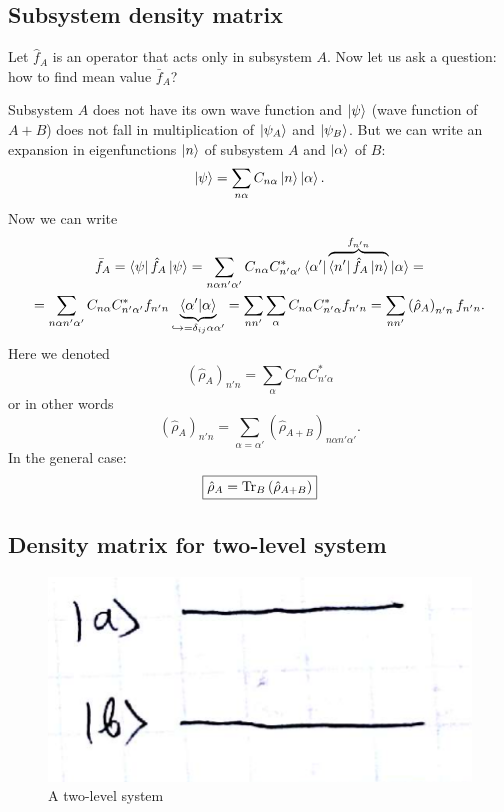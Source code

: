 \subsection{Subsystem density matrix}

Let $\hat{f}_A$ is an operator that acts only in subsystem $A$. Now let us ask a question: how to find mean value $\bar{f}_A$?

Subsystem $A$ does not have its own wave function and $\left\lvert {\psi} \right\rangle$ (wave function of $A + B$) does not fall in multiplication of $\left\lvert {\psi_A} \right\rangle$ and $\left\lvert {\psi_B} \right\rangle$. But we can write an expansion in eigenfunctions $\left\lvert {n} \right\rangle$ of subsystem $A$ and $\left\lvert {\alpha} \right\rangle$ of $B$:
\begin{equation}
	\left\lvert {\psi} \right\rangle = \sum_{n \alpha} C_{n \alpha} \left\lvert {n} \right\rangle \left\lvert {\alpha} \right\rangle.
\end{equation}
Now we can write
\begin{multline}
	\bar{f}_A = \left\langle {\psi} \right\rvert \hat{f}_A \left\lvert {\psi} \right\rangle = \sum_{n \alpha n' \alpha'} C_{n \alpha} C^*_{n' \alpha'} \left\langle {\alpha'} \right\rvert \overbrace{\left\langle {n'} \right\rvert \hat{f}_A \left\lvert {n} \right\rangle}^{f_{n' n}} \left\lvert {\alpha} \right\rangle = \\ =
	\sum_{n \alpha n' \alpha'} C_{n \alpha} C^*_{n' \alpha'} f_{n' n} \underbrace{\langle {\alpha'} \lvert {\alpha} \rangle}_{\hookrightarrow = \delta_{ij}\alpha \alpha'} = \sum_{n n'} \sum_{\alpha}  C_{n \alpha} C^*_{n' \alpha} f_{n' n} = \sum_{n n'} \left( \hat{\rho}_A \right)_{n' n} f_{n' n}.
\end{multline}
Here we denoted
\begin{equation}
	\left( \hat{\rho}_A \right)_{n' n} = \sum_{\alpha}  C_{n \alpha} C^*_{n' \alpha}
\end{equation}
or in other words
\begin{equation}
	\left( \hat{\rho}_A \right)_{n' n} = \sum_{\alpha = \alpha'} \left( \hat{\rho}_{A+B} \right)_{n \alpha n' \alpha'}.
\end{equation}
In the general case:
\begin{equation}
	\boxed{\hat{\rho}_A = \operatorname{Tr}_B \left( \hat{\rho}_{A+B} \right)}
\end{equation}


\subsection{Density matrix for two-level system}

\begin{figure}[h!]
	\centering
	\includegraphics[width=0.25\linewidth]{fig/L4/2lvl}
	\caption{A two-level system}
	\label{fig:2lvl5}
\end{figure}

